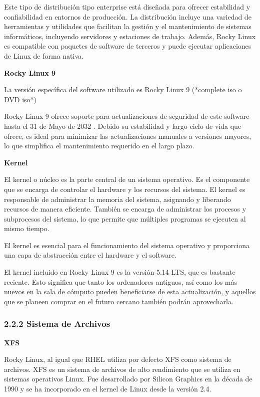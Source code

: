 \begin{doublespace}
    Este tipo de distribución tipo enterprise está diseñada para ofrecer estabilidad y confiabilidad en entornos de producción. La distribución incluye una variedad de herramientas y utilidades que facilitan la gestión y el mantenimiento de sistemas informáticos, incluyendo servidores y estaciones de trabajo. Además, Rocky Linux es compatible con paquetes de software de terceros y puede ejecutar aplicaciones de Linux de forma nativa. \cite{RL-1}

    \textbf{Rocky Linux 9}
    
    La versión específica del software utilizado es Rocky Linux 9 (*complete iso o DVD iso*) \cite{RL9-download-1} \cite{RL9-release-1}  \cite{RHEL-release-1} 

    Rocky Linux 9 ofrece soporte para actualizaciones de seguridad de este software hasta el 31 de Mayo de 2032 \cite{RL9-EOL-1}. Debido su estabilidad y largo ciclo de vida que ofrece, es ideal para minimizar las actualizaciones manuales a versiones mayores, lo que simplifica el mantenimiento requerido en el largo plazo.

    \textbf{Kernel}

    El kernel o núcleo es la parte central de un sistema operativo. Es el componente que se encarga de controlar el hardware y los recursos del sistema. El kernel es responsable de administrar la memoria del sistema, asignando y liberando recursos de manera eficiente. También se encarga de administrar los procesos y subprocesos del sistema, lo que permite que múltiples programas se ejecuten al mismo tiempo.

    El kernel es esencial para el funcionamiento del sistema operativo y proporciona una capa de abstracción entre el hardware y el software.  \cite{RHEL-kernel-1}

    El kernel incluido en Rocky Linux 9 es la versión 5.14 LTS, que es bastante reciente. Esto significa que tanto los ordenadores antiguos, así como los más nuevos en la sala de cómputo pueden beneficiarse de esta actualización, y aquellos que se planeen comprar en el futuro cercano también podrán aprovecharla. \cite{RL9-release-1}

    \subsubsection{2.2.2 Sistema de Archivos}

    \textbf{XFS}
    
    Rocky Linux, al igual que RHEL utiliza por defecto XFS como sistema de archivos. XFS es un sistema de archivos de alto rendimiento que se utiliza en sistemas operativos Linux. Fue desarrollado por Silicon Graphics en la década de 1990 y se ha incorporado en el kernel de Linux desde la versión 2.4.


\end{doublespace}
